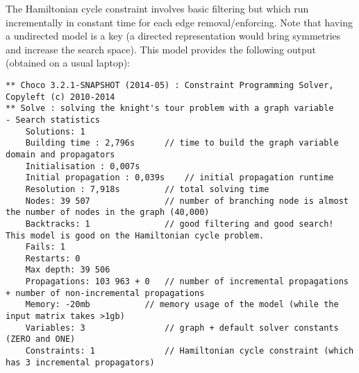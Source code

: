 \documentclass{article}
\begin{document}
The Hamiltonian cycle constraint involves basic filtering but which run incrementally in constant time for each edge removal/enforcing. 
Note that having a undirected model is a key (a directed representation would bring symmetries and increase the search space). 
This model provides the following output (obtained on a usual laptop):
\begin{lstlisting}
** Choco 3.2.1-SNAPSHOT (2014-05) : Constraint Programming Solver, Copyleft (c) 2010-2014
** Solve : solving the knight's tour problem with a graph variable
- Search statistics
	Solutions: 1
	Building time : 2,796s		// time to build the graph variable domain and propagators
	Initialisation : 0,007s
	Initial propagation : 0,039s	// initial propagation runtime
	Resolution : 7,918s			// total solving time
	Nodes: 39 507				// number of branching node is almost the number of nodes in the graph (40,000)
	Backtracks: 1				// good filtering and good search! This model is good on the Hamiltonian cycle problem.
	Fails: 1					
	Restarts: 0
	Max depth: 39 506
	Propagations: 103 963 + 0	// number of incremental propagations + number of non-incremental propagations
	Memory: -20mb			// memory usage of the model (while the input matrix takes >1gb)
	Variables: 3				// graph + default solver constants (ZERO and ONE)
	Constraints: 1				// Hamiltonian cycle constraint (which has 3 incremental propagators)
\end{lstlisting}
\end{document}
